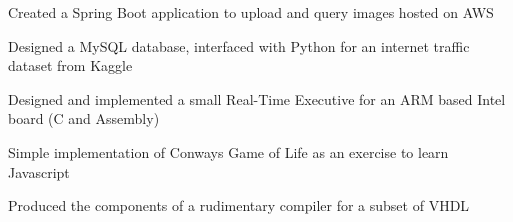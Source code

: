 \documentclass[]{hieudo-build}
\begin{document}
\begin{minipage}[t]{1.0\textwidth}
\descript{}
Created a Spring Boot application to upload and query images hosted on AWS
\sectionsep

\descript{}
Designed a MySQL database, interfaced with Python for an internet traffic dataset from Kaggle
\sectionsep

\descript{}
Designed and implemented a small Real-Time Executive for an ARM based Intel board (C and Assembly)
\sectionsep

\descript{}
Simple implementation of Conways Game of Life as an exercise to learn Javascript
\sectionsep

\descript{}
Produced the components of a rudimentary compiler for a subset of VHDL
\sectionsep






\end{minipage} 
\end{document}
